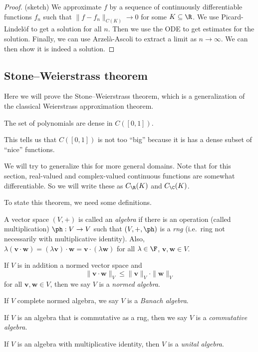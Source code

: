 \documentclass[a4paper]{article}
\begin{document}
\begin{proof}(sketch)
  We approximate $f$ by a sequence of continuously differentiable functions $f_n$ such that $\|f - f_n\|_{C(K)} \to 0$ for some $K\subseteq \R$. We use Picard-Lindel\"of to get a solution for all $n$. Then we use the ODE to get estimates for the solution. Finally, we can use Arzel\`a-Ascoli to extract a limit as $n \to \infty$. We can then show it is indeed a solution.
\end{proof}

\subsection{Stone--Weierstrass theorem}
Here we will prove the Stone--Weierstrass theorem, which is a generalization of the classical Weierstrass approximation theorem.
\begin{thm}
  The set of polynomials are dense in $C([0, 1])$.
\end{thm}
This tells us that $C([0, 1])$ is not too ``big'' because it is has a dense subset of ``nice'' functions.

We will try to generalize this for more general domains. Note that for this section, real-valued and complex-valued continuous functions are somewhat differentiable. So we will write these as $C_{\R}(K)$ and $C_{\C}(K)$.

To state this theorem, we need some definitions.

\begin{defi}[Algebra]
  A vector space $(V, +)$ is called an \emph{algebra} if there is an operation (called multiplication) $\ph: V \to V$ such that $(V, +, \ph)$ is a \emph{rng} (i.e.\ ring not necessarily with multiplicative identity). Also, $\lambda(\mathbf{v}\cdot \mathbf{w}) = (\lambda \mathbf{v})\cdot \mathbf{w} = \mathbf{v}\cdot (\lambda \mathbf{w})$ for all $\lambda \in \F$, $\mathbf{v}, \mathbf{w} \in V$.

  If $V$ is in addition a normed vector space and
  \[
    \|\mathbf{v}\cdot \mathbf{w}\|_V \leq \|\mathbf{v}\|_V \cdot \|\mathbf{w}\|_V
  \]
  for all $\mathbf{v}, \mathbf{w} \in V$, then we say $V$ is a \emph{normed algebra}.

  If $V$ complete normed algebra, we say $V$ is a \emph{Banach algebra}.

  If $V$ is an algebra that is commutative as a rng, then we say $V$ is a \emph{commutative algebra}.

  If $V$ is an algebra with multiplicative identity, then $V$ is a \emph{unital algebra}.
\end{defi}
\end{document}
